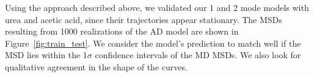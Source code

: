 \documentclass[12pt]{article}
\begin{document}

  Using the approach described above, we validated our 1 and 2 mode models with
  urea and acetic acid, since their trajectories appear stationary. 
  The MSDs resulting from 1000 realizations of the AD model are shown in 
  Figure~\ref{fig:train_test}. We consider the model's prediction to match well if the
  MSD lies within the 1$\sigma$ confidence intervals of the MD MSDs. We also
  look for qualitative agreement in the shape of the curves.
  
\end{document}
